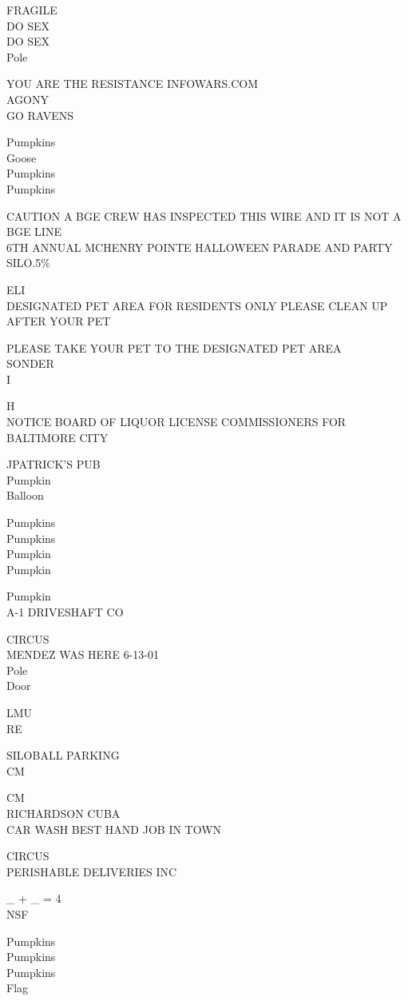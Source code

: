 \documentclass[10pt,letterpaper]{article}
\begin{document}
FRAGILE\\
DO SEX\\
DO SEX\\
Pole

YOU ARE THE RESISTANCE INFOWARS.COM\\
AGONY\\
GO RAVENS

Pumpkins\\
Goose\\
Pumpkins\\
Pumpkins

CAUTION A BGE CREW HAS INSPECTED THIS WIRE AND IT IS NOT A BGE LINE\\
6TH ANNUAL MCHENRY POINTE HALLOWEEN PARADE AND PARTY\\
SILO.5\%

ELI\\
DESIGNATED PET AREA FOR RESIDENTS ONLY PLEASE CLEAN UP AFTER YOUR PET

PLEASE TAKE YOUR PET TO THE DESIGNATED PET AREA\\
SONDER\\
I

H\\
NOTICE BOARD OF LIQUOR LICENSE COMMISSIONERS FOR BALTIMORE CITY

JPATRICK'S PUB\\
Pumpkin\\
Balloon

Pumpkins\\
Pumpkins\\
Pumpkin\\
Pumpkin

Pumpkin\\
A{-}1 DRIVESHAFT CO

CIRCUS\\
MENDEZ WAS HERE 6{-}13{-}01\\
Pole\\
Door

LMU\\
RE

SILOBALL PARKING\\
CM

CM\\
RICHARDSON CUBA\\
CAR WASH BEST HAND JOB IN TOWN

CIRCUS\\
PERISHABLE DELIVERIES INC

\_ + \_ = 4\\
NSF

Pumpkins\\
Pumpkins\\
Pumpkins\\
Flag
\end{document}
